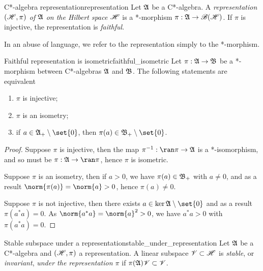 \begin{definition}{C*-algebra representation}{representation}
    Let \(\mathfrak{A}\) be a C*-algebra. A \emph{representation \((\mathscr{H}, \pi)\) of \(\mathfrak{A}\) on the Hilbert space \(\mathscr{H}\)} is a *-morphism \(\pi : \mathfrak{A} \to \mathscr{B}(\mathscr{H})\). If \(\pi\) is injective, the representation is \emph{faithful}.
\end{definition}
\begin{remark}
    In an abuse of language, we refer to the representation simply to the *-morphism.
\end{remark}

\begin{proposition}{Faithful representation is isometric}{faithful_isometric}
    Let \(\pi : \mathfrak{A} \to \mathfrak{B}\) be a *-morphism between C*-algebras \(\mathfrak{A}\) and \(\mathfrak{B}\). The following statements are equivalent
    \begin{enumerate}[label=(\alph*)]
        \item \(\pi\) is injective;
        \item \(\pi\) is an isometry;
        \item if \(a \in \algebra{A}_+ \setminus\set{0}\), then \(\pi(a) \in \algebra{B}_+\setminus\set{0}\).
    \end{enumerate}
\end{proposition}
\begin{proof}
    Suppose \(\pi\) is injective, then the map \(\pi^{-1} : \ran\pi \to \algebra{A}\) is a *-isomorphism, and so must be \(\pi : \algebra{A} \to \ran\pi\), hence \(\pi\) is isometric.

    Suppose \(\pi\) is an isometry, then if \(a > 0\), we have \(\pi(a) \in \mathfrak{B}_+\) with \(a \neq 0\), and as a result \(\norm{\pi(a)} = \norm{a} > 0\), hence \(\pi(a) \neq 0\).

    Suppose \(\pi\) is not injective, then there exists \(a \in \ker{\algebra{A}}\setminus\set{0}\) and as a result \(\pi(a^*a) = 0\). As \(\norm{a^*a} = \norm{a}^2 > 0\), we have \(a^*a > 0\) with \(\pi(a^*a) = 0\).
\end{proof}
\begin{definition}{Stable subspace under a representation}{stable_under_representation}
    Let \(\mathfrak{A}\) be a C*-algebra and \((\mathscr{H}, \pi)\) a representation. A linear subspace \(\mathscr{V} \subset \mathscr{H}\) is \emph{stable}, or \emph{invariant}, \emph{under the representation \(\pi\)} if \(\pi(\mathfrak{A})\mathscr{V} \subset \mathscr{V}\).
\end{definition}


